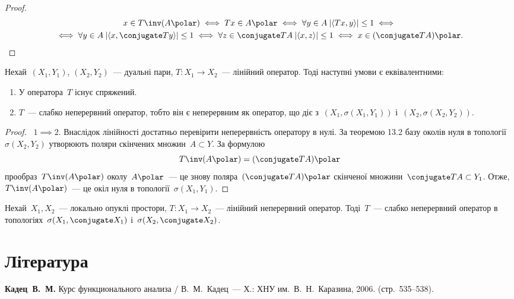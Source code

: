 \begin{proof}
    \begin{multline*}
        x \in T\inv(A\polar) \iff T x \in A\polar \iff \forall y \in A \: |\langle T x, y\rangle| \le 1 \iff \\
        \iff \forall y \in A \: |\langle x, \conjugate T y\rangle| \le 1 \iff \forall z \in \conjugate T A \: |\langle x, z\rangle| \le 1 \iff x \in (\conjugate T A)\polar. \qedhere
    \end{multline*}
\end{proof}

\begin{theorem}
    Нехай~$(X_1, Y_1)$, $(X_2, Y_2)$~--- дуальні пари, $T: X_1 \to X_2$~--- лінійний оператор. Тоді наступні умови є еквівалентними:
    \begin{enumerate}
        \item У оператора~$T$ існує спряжений.
        \item $T$~--- слабко неперервний оператор, тобто він є неперервним як оператор, що діє з~$(X_1, \sigma(X_1, Y_1))$ і~$(X_2, \sigma(X_2, Y_2))$.
    \end{enumerate}
\end{theorem}

\begin{proof}
   ~$1 \implies 2$. Внаслідок лінійності достатньо перевірити неперервність оператору в нулі. За теоремою 13.2 базу околів нуля в топології~$\sigma(X_2, Y_2)$ утворюють поляри скінчених множин~$A \subset Y$. За формулою
    \begin{equation*}
        T\inv(A\polar) = (\conjugate T A)\polar
    \end{equation*}
    прообраз~$T\inv(A\polar)$ околу~$A\polar$~--- це знову поляра~$(\conjugate T A)\polar$ скінченої множини~$\conjugate T A \subset Y_1$. Отже, $T\inv(A\polar)$~--- це окіл нуля в топології~$\sigma(X_1, Y_1)$.
\end{proof}

\begin{corollary}
    Нехай~$X_1, X_2$~--- локально опуклі простори, $T: X_1 \to X_2$~--- лінійний неперервний оператор. Тоді~$T$~--- слабко неперервний оператор в топологіях~$\sigma(X_1, \conjugate X_1)$ і~$\sigma(X_2, \conjugate X_2)$.
\end{corollary}

\section{Література}

\begin{enumerate}[label={[\arabic*]}]
\item \textbf{Кадец~В.~М.}
Курс функционального анализа /
В.~М.~Кадец~---
Х.: ХНУ им.~В.~Н.~Каразина, 2006. (стр.~535--538).
\end{enumerate}
